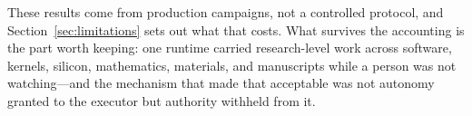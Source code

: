 These results come from production campaigns, not a controlled protocol, and
Section~\ref{sec:limitations} sets out what that costs. What survives the accounting
is the part worth keeping: one runtime carried research-level work across software,
kernels, silicon, mathematics, materials, and manuscripts while a person was not
watching---and the mechanism that made that acceptable was not autonomy granted to
the executor but authority withheld from it.

